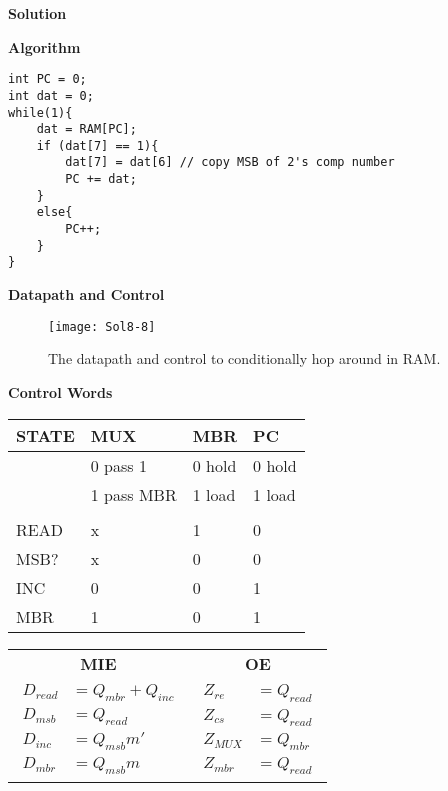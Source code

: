 \begin{enumerate}
        \begin{onlysolution}[fragile]\filbreak  \textbf{Solution}\par
            \textbf{Algorithm}
              \begin{verbatim}
int PC = 0;
int dat = 0;
while(1){
    dat = RAM[PC];
    if (dat[7] == 1){
        dat[7] = dat[6] // copy MSB of 2's comp number
        PC += dat;
    }
    else{
        PC++;
    }
}
\end{verbatim}
            \textbf{Datapath and Control}
            \begin{figure}[H]
                \texttt{[image: Sol8-8]}
                \caption{The datapath and control to conditionally hop around
                in RAM.}
            \end{figure}

            \textbf{Control Words}

            \begin{tabular}{l|l|l|l}
                STATE & MUX        & MBR    & PC     \\ \hline
                & 0 pass 1   & 0 hold & 0 hold \\ \hline
                & 1 pass MBR & 1 load & 1 load \\ \hline
                &            &        &        \\ \hline
                READ  & x          & 1      & 0      \\ \hline
                MSB?  & x          & 0      & 0      \\ \hline
                INC   & 0          & 0      & 1      \\ \hline
                MBR   & 1          & 0      & 1      \\
            \end{tabular}

            \begin{tabular}{cc}
                \textbf{MIE}       & \textbf{OE} \\
                {$
                    \begin{aligned}
                        D_{read} & = Q_{mbr}+Q_{inc} \\
                        D_{msb}  & = Q_{read}        \\
                        D_{inc}  & = Q_{msb} m'      \\
                        D_{mbr}  & = Q_{msb} m
                \end{aligned}$} &
                {$
                    \begin{aligned}
                        Z_{re}  & = Q_{read} \\
                        Z_{cs}  & = Q_{read} \\
                        Z_{MUX} & = Q_{mbr}  \\
                        Z_{mbr} & = Q_{read}
                \end{aligned}$}
            \end{tabular}\\
        \end{onlysolution}


\end{enumerate}

